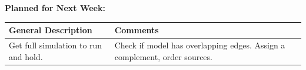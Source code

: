 \documentclass{article}
\begin{document}
\textbf{Planned for Next Week: }

\renewcommand{\arraystretch}{1.5}
\begin{table}[H]
    \centering
    \begin{tabularx}{0.95\textwidth} { 
        | >{\centering\arraybackslash}X
        | >{\centering\arraybackslash}X | }

    \hline
    \textbf{General Description} & \textbf{Comments} \\
    \hline
    Get full simulation to run and hold.   & Check if model has overlapping edges. Assign a complement, order sources.  \\
    \hline
    \end{tabularx}
\end{table}
\end{document}
